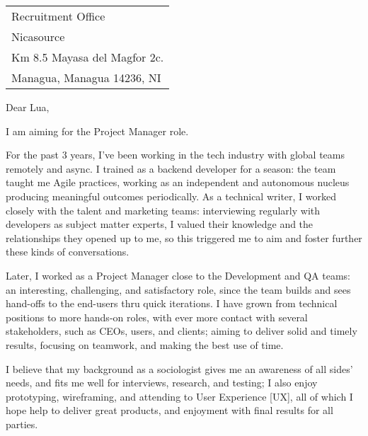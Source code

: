 \begin{tabular}{@{} l}
    Recruitment Office \\
    Nicasource \\
    Km 8.5 Mayasa del Magfor 2c. \\ %
    Managua, Managua 14236, NI
\end{tabular}

\bigskip %


Dear Lua,
\bigskip %


I am aiming for the Project Manager role.

For the past 3 years, I've been working in the tech industry with global teams remotely and async. 
I trained as a backend developer for a season: 
the team taught me Agile practices, working as an independent and autonomous nucleus
producing meaningful outcomes periodically.
As a technical writer, I worked closely with the talent and marketing teams:
interviewing regularly with developers as subject matter experts,
I valued their knowledge and the relationships they opened up to me,
so this triggered me to aim and foster further these kinds of conversations.

Later, I worked as a Project Manager close to the Development and QA teams:
an interesting, challenging, and satisfactory role, 
since the team builds and sees 
hand-offs to the end-users thru quick iterations.
I have grown from technical positions to more hands-on roles, with ever more contact 
with several stakeholders, such as CEOs, users, and clients; 
aiming to deliver solid and timely results, 
focusing on teamwork, 
and making the best use of time.

I believe that my background 
as a sociologist gives me an awareness of all sides' needs, 
and fits me well for interviews, research, and testing;
I also enjoy prototyping, wireframing, and attending to User Experience [UX], 
all of which I hope help to deliver great products, and enjoyment with final results for all parties.


